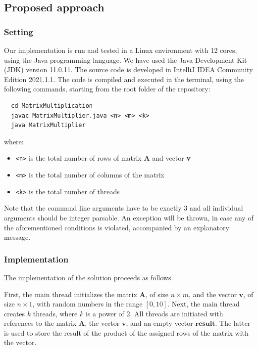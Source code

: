 \documentclass[acmlarge]{acmart}
\begin{document}
\subsection{Proposed approach}

\subsubsection{Setting}
\label{subsubsec:setting}
Our implementation is run and tested in a Linux environment with 12 cores, using the Java programming language.
We have used the Java Development Kit (JDK) version 11.0.11.
The source code is developed in IntelliJ IDEA Community Edition 2021.1.1.
The code is compiled and executed in the terminal, using the following commands, starting from the root folder of the repository:
\begin{verbatim}
  cd MatrixMultiplication
  javac MatrixMultiplier.java <n> <m> <k>
  java MatrixMultiplier
\end{verbatim}
where:
\begin{itemize}
  \item \texttt{<n>} is the total number of rows of matrix \textbf{A} and vector \textbf{v}
  \item \texttt{<m>} is the total number of columns of the matrix
  \item \texttt{<k>} is the total number of threads
\end{itemize}
Note that the command line arguments have to be exactly 3 and all individual arguments should be integer parsable. An exception will be thrown, in case any of the aforementioned conditions is violated, accompanied by an explanatory message.


\subsubsection{Implementation}
The implementation of the solution proceeds as follows.

First, the main thread initializes the matrix $\mathbf{A}$, of size $n \times m$, and the vector $\mathbf{v}$, of size $n \times 1$, with random numbers in the range $[0, 10]$. Next, the main thread creates $k$ threads, where $k$ is a power of 2. All threads are initiated with references to the matrix $\mathbf{A}$, the vector $\mathbf{v}$, and an empty vector $\mathbf{result}$. The latter is used to store the result of the product of the assigned rows of the matrix with the vector.
\end{document}
